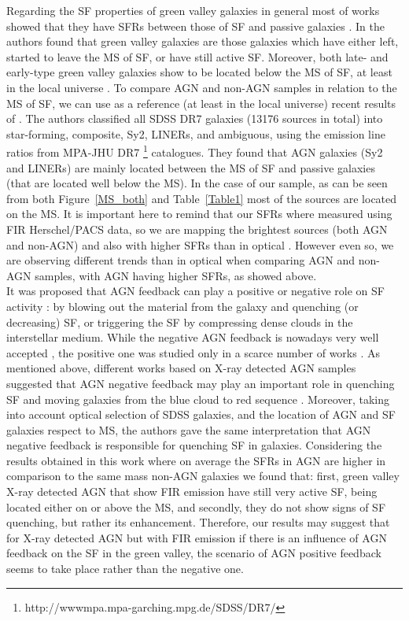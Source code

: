 \documentclass[fleqn,usenatbib]{mnras}
\begin{document}
\indent Regarding the SF properties of green valley galaxies in general most of works showed that they have SFRs between those of SF and passive galaxies \citep[e.g.,][]{Schiminovich, Salim, Schawinski}. In \citet{Smethurst} the authors found that green valley galaxies are those galaxies which have either left, started to leave the MS of SF, or have still active SF. Moreover, both late- and early-type green valley galaxies show to be located below the MS of SF, at least in the local universe \citep{Schawinski}. To compare AGN and non-AGN samples in relation to the MS of SF, we can use as a reference (at least in the local universe) recent results of \citet{Leslie2016}. The authors classified all SDSS DR7 galaxies (13176 sources in total) into star-forming, composite, Sy2, LINERs, and ambiguous, using the emission line ratios from MPA-JHU DR7 \footnote{http://wwwmpa.mpa-garching.mpg.de/SDSS/DR7/} catalogues. They found that AGN galaxies (Sy2 and LINERs) are mainly located between the MS of SF and passive galaxies (that are located well below the MS). In the case of our sample, as can be seen from both Figure~\ref{MS_both} and Table~\ref{Table1} most of the sources are located on the MS. It is important here to remind that our SFRs where measured using FIR Herschel/PACS data, so we are mapping the brightest sources (both AGN and non-AGN) and also with higher SFRs than in optical \citep{Ellison2016}. However even so, we are observing different trends than in optical when comparing AGN and non-AGN samples, with AGN having higher SFRs, as showed above.  \\
\indent It was proposed that AGN feedback can play a positive or negative role on SF activity \citep[e.g.,][and references therein]{Salom2015, Ciotti2015}: by blowing out the material from the galaxy and quenching (or decreasing) SF, or triggering the SF by compressing dense clouds in the interstellar medium. While the negative AGN feedback is nowadays very well accepted \citep[][and references therein]{Silk2010, Heckman2014}, the positive one was studied only in a scarce number of works \citep[e.g.][and references therein]{Salom2015}. As mentioned above, different works based on X-ray detected AGN samples suggested that AGN negative feedback may play an important role in quenching SF and moving galaxies from the blue cloud to red sequence \citep{Sanchez2004, Nandra, Georgakakis2008, Silverman2008, Treister, Povi2, Povi}. Moreover, taking into account \cite{Leslie2016} optical selection of SDSS galaxies, and the location of AGN and SF galaxies respect to MS, the authors gave the same interpretation that AGN negative feedback is responsible for quenching SF in galaxies. Considering the results obtained in this work where on average the SFRs in AGN are higher in comparison to the same mass non-AGN galaxies we found that: first, green valley X-ray detected AGN that show FIR emission have still very active SF, being located either on or above the MS, and secondly, they do not show signs of SF quenching, but rather its enhancement. Therefore, our results may suggest that for X-ray detected AGN but with FIR emission if there is an influence of AGN feedback on the SF in the green valley, the scenario of AGN positive feedback seems to take place rather than the negative one. \\
\end{document}
